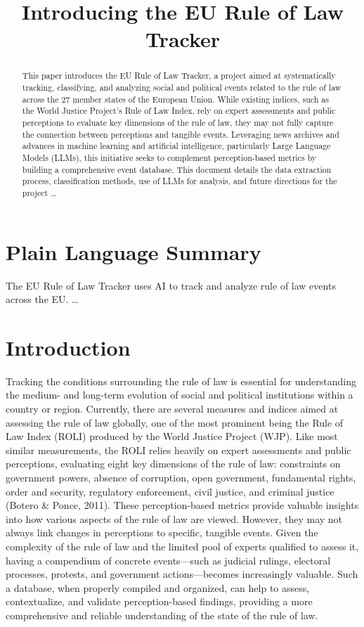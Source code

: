 \documentclass[
]{agujournal2019}
\begin{document}
\title{Introducing the EU Rule of Law Tracker}



\begin{abstract}
This paper introduces the EU Rule of Law Tracker, a project aimed at
systematically tracking, classifying, and analyzing social and political
events related to the rule of law across the 27 member states of the
European Union. While existing indices, such as the World Justice
Project's Rule of Law Index, rely on expert assessments and public
perceptions to evaluate key dimensions of the rule of law, they may not
fully capture the connection between perceptions and tangible events.
Leveraging news archives and advances in machine learning and artificial
intelligence, particularly Large Language Models (LLMs), this initiative
seeks to complement perception-based metrics by building a comprehensive
event database. This document details the data extraction process,
classification methods, use of LLMs for analysis, and future directions
for the project \ldots{}
\end{abstract}

\section*{Plain Language Summary}
The EU Rule of Law Tracker uses AI to track and analyze rule of law
events across the EU. \ldots{}




\section{Introduction}\label{introduction}

Tracking the conditions surrounding the rule of law is essential for
understanding the medium- and long-term evolution of social and
political institutions within a country or region. Currently, there are
several measures and indices aimed at assessing the rule of law
globally, one of the most prominent being the Rule of Law Index (ROLI)
produced by the World Justice Project (WJP). Like most similar
measurements, the ROLI relies heavily on expert assessments and public
perceptions, evaluating eight key dimensions of the rule of law:
constraints on government powers, absence of corruption, open
government, fundamental rights, order and security, regulatory
enforcement, civil justice, and criminal justice (Botero \& Ponce,
2011). These perception-based metrics provide valuable insights into how
various aspects of the rule of law are viewed. However, they may not
always link changes in perceptions to specific, tangible events. Given
the complexity of the rule of law and the limited pool of experts
qualified to assess it, having a compendium of concrete events---such as
judicial rulings, electoral processes, protests, and government
actions---becomes increasingly valuable. Such a database, when properly
compiled and organized, can help to assess, contextualize, and validate
perception-based findings, providing a more comprehensive and reliable
understanding of the state of the rule of law.
\end{document}
